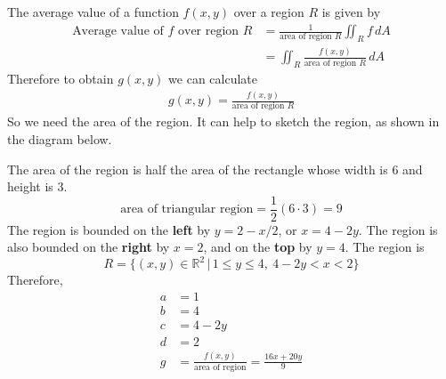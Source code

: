     \ifnum {} 
    {\color{DarkBlue} 
    The average value of a function $f(x,y)$ over a region $R$ is given by 
    \begin{align}
        \text{Average value of }f\text{ over region }R &= \frac{1}{\text{area of region }R}\iint_R f \, dA \\&= \iint_R \frac{f(x,y)}{\text{area of region }R} \, dA
    \end{align}
    Therefore to obtain $g(x,y)$ we can calculate
    \begin{align}
        g(x,y) = \frac{f(x,y)}{\text{area of region }R}
    \end{align}
    So we need the area of the region. It can help to sketch the region, as shown in the diagram below. 
       \begin{center}     
    \end{center}     
    The area of the region is half the area of the rectangle whose width is 6 and height is 3. 
    $$\text{area of triangular region} = \frac12 ( 6 \cdot 3) = 9$$
    The region is bounded on the \textbf{left} by $y=2-x/2$, or $x=4-2y$. The region is also bounded on the \textbf{right} by $x=2$, and on the \textbf{top} by $y=4$. The region is 
    $$R = \{(x,y) \in \mathbb R^2 \, | \, 1\le y \le 4, \ 4-2y < x < 2\}$$
    Therefore, 
    \begin{align}
        a & = 1 \\
        b &= 4 \\
        c &= 4 - 2y \\
        d &= 2 \\
        g &= \frac{f(x,y)}{\text{area of region}} = \frac{16x+20y}{9} 
    \end{align}
    }
   \else

